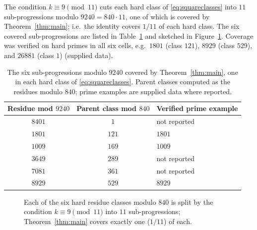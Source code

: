 \documentclass[11pt,a4paper]{article}
\theoremstyle{definition}
\begin{document}
The condition $k \equiv 9 \pmod{11}$ cuts each hard class of
\eqref{eq:squareclasses} into $11$ sub-progressions modulo
$9240 = 840 \cdot 11$, one of which is covered by Theorem~\ref{thm:main};
i.e.\ the identity covers $1/11$ of each hard class. The six covered
sub-progressions are listed in Table~\ref{tab:subfamilies} and sketched in
Figure~\ref{fig:coverage}. Coverage was verified on hard primes in all six
cells, e.g.\ $1801$ (class $121$), $8929$ (class $529$), and $26881$
(class $1$) (supplied data).

\begin{table}[t]
  \centering
  \begin{tabular}{ccl}
    \toprule
    Residue mod $9240$ & Parent class mod $840$ & Verified prime example \\
    \midrule
    $8401$ & $1$   & not reported \\
    $1801$ & $121$ & $1801$ \\
    $1009$ & $169$ & $1009$ \\
    $3649$ & $289$ & not reported \\
    $7081$ & $361$ & not reported \\
    $8929$ & $529$ & $8929$ \\
    \bottomrule
  \end{tabular}
  \caption{The six sub-progressions modulo $9240$ covered by
    Theorem~\ref{thm:main}, one in each hard class of
    \eqref{eq:squareclasses}. Parent classes computed as the residues
    modulo $840$; prime examples are supplied data where reported.}
  \label{tab:subfamilies}
\end{table}

\begin{figure}[t]
  \centering
  \caption{Each of the six hard residue classes modulo $840$ is split by
    the condition $k \equiv 9 \pmod{11}$ into $11$ sub-progressions;
    Theorem~\ref{thm:main} covers exactly one ($1/11$) of each.}
  \label{fig:coverage}
\end{figure}
\end{document}

